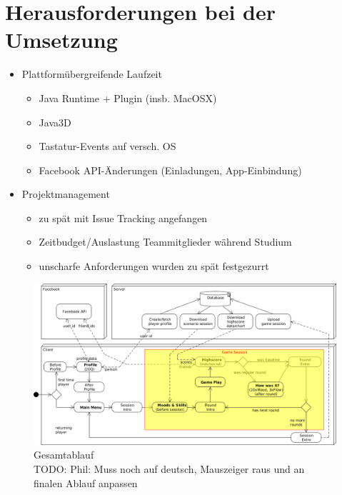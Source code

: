 \documentclass[a4paper,12pt]{scrartcl}
\begin{document}
\section{Herausforderungen bei der Umsetzung}

\begin{itemize}
  \item Plattformübergreifende Laufzeit
  \begin{itemize}
    \item Java Runtime + Plugin (insb. MacOSX)
    \item Java3D
\item Tastatur-Events auf versch. OS
\item Facebook API-Änderungen (Einladungen, App-Einbindung)
  \end{itemize}
\item Projektmanagement
\begin{itemize}
  \item zu spät mit Issue Tracking angefangen
  \item Zeitbudget/Auslastung Teammitglieder während Studium
  \item unscharfe Anforderungen wurden zu spät festgezurrt
\end{itemize}

\end{itemize}

\begin{figure}[htp]
\begin{center}
  \includegraphics[width=\textwidth]{Gesamtablauf.png}
  \caption[Gesamtablauf]{Gesamtablauf\\
TODO: Phil: Muss noch auf deutsch, Mauszeiger raus und an finalen Ablauf anpassen}
  \label{fig:Gesamtablauf}
\end{center}
\end{figure} 


\clearpage

\clearpage
{}
\listoffigures
  
\clearpage
{}
{}

\end{document}
